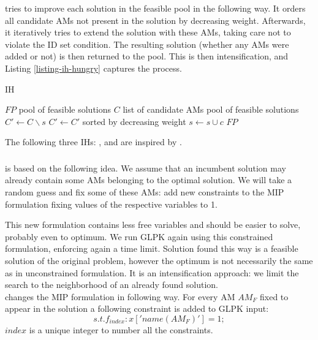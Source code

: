  tries to improve each solution in the feasible pool in the following way. It orders all candidate AMs not present in the solution by decreasing weight. Afterwards, it iteratively tries to extend the solution with these AMs, taking care not to violate the ID set condition. The resulting solution (whether any AMs were added or not) is then returned to the pool. This is then intensification, and Listing \ref{listing-ih-hungry} captures the process.\\

\begin{algorithm}
\caption{ IH}
\label{listing-ih-hungry}
\begin{algorithmic}
\REQUIRE $FP$ pool of feasible solutions
\REQUIRE $C$ list of candidate AMs
\ENSURE pool of feasible solutions
  \STATE {}
  \STATE $C' \gets C \backslash s$
  \STATE $C' \gets C'$ sorted by decreasing weight
      \STATE $s \gets s \cup c$
    \ENDIF
  \ENDFOR
\ENDFOR
\RETURN $FP$
\end{algorithmic}
\end{algorithm}

The following three IHs: ,  and  are inspired by \cite{heu-lecture}.

\subsubsection{}

 is based on the following idea. We assume that an incumbent solution may already contain some AMs belonging to the optimal solution. We will take a random guess and fix some of these AMs: add new constraints to the MIP formulation fixing values of the respective variables to 1.

This new formulation contains less free variables and should be easier to solve, probably even to optimum. We run GLPK again using this constrained formulation, enforcing again a time limit. Solution found this way is a feasible solution of the original problem, however the optimum is not necessarily the same as in unconstrained formulation. It is an intensification approach: we limit the search to the neighborhood of an already found solution.\\

 changes the MIP formulation in following way. For every AM $AM_F$ fixed to appear in the solution a following constraint is added to GLPK input:
\[s.t. f_{index}: x['name(AM_F)'] = 1;\]
$index$ is a unique integer to number all the constraints.

